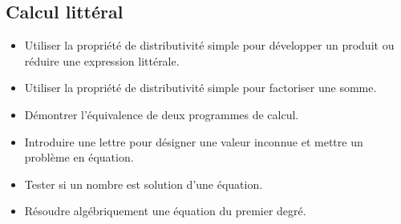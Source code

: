 \documentclass[a4paper,12pt,fleqn]{article}	
\begin{document}
\subsection*{Calcul littéral}

\begin{itemize}
	\item {}Utiliser la propriété de distributivité simple pour développer un produit ou réduire une expression littérale.
	\item {}Utiliser la propriété de distributivité simple pour factoriser une somme.
	\item {}Démontrer l’équivalence de deux programmes de calcul.
	\item {}Introduire une lettre pour désigner une valeur inconnue et mettre un problème en équation.
	\item {}Tester si un nombre est solution d’une équation.
	\item {}Résoudre algébriquement une équation du premier degré.
\end{itemize}

	
\end{document}

